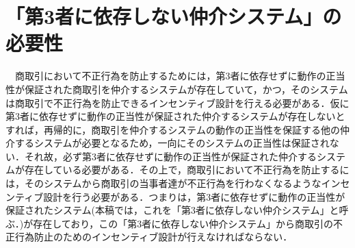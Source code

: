 \documentclass[twocolumn, a4j]{article}
\begin{document}
\section{「第3者に依存しない仲介システム」の必要性}
  　商取引において不正行為を防止するためには，第3者に依存せずに動作の正当性が保証された商取引を仲介するシステムが存在していて，かつ，そのシステムは商取引で不正行為を防止できるインセンティブ設計を行える必要がある．仮に第3者に依存せずに動作の正当性が保証された仲介するシステムが存在しないとすれば，再帰的に，商取引を仲介するシステムの動作の正当性を保証する他の仲介するシステムが必要となるため，一向にそのシステムの正当性は保証されない．それ故，必ず第3者に依存せずに動作の正当性が保証された仲介するシステムが存在している必要がある．その上で，商取引において不正行為を防止するには，そのシステムから商取引の当事者達が不正行為を行わなくなるようなインセンティブ設計を行う必要がある．つまりは，第3者に依存せずに動作の正当性が保証されたシステム(本稿では，これを「第3者に依存しない仲介システム」と呼ぶ．)が存在しており，この「第3者に依存しない仲介システム」から商取引の不正行為防止のためのインセンティブ設計が行えなければならない．



\end{document}
